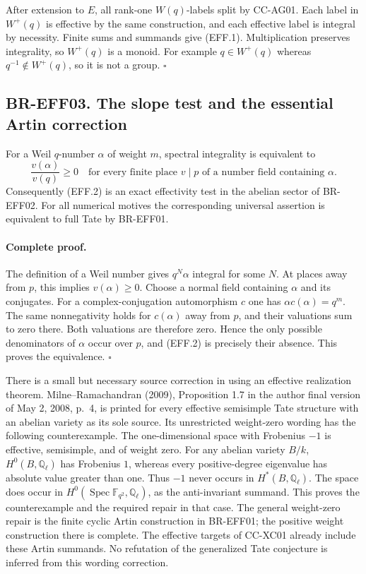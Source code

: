 \documentclass[11pt,a4paper]{article}
\theoremstyle{definition}\newtheorem{definition}[theorem]{Definition}
\theoremstyle{remark}\newtheorem{remark}[theorem]{Remark}
\begin{document}
After extension to $E$, all rank-one $W(q)$-labels split by
CC-AG01.  Each label in $W^+(q)$ is effective by the same
construction, and each effective label is integral by necessity.
Finite sums and summands give (EFF.1).  Multiplication preserves
integrality, so $W^+(q)$ is a monoid.  For example $q\in W^+(q)$
whereas $q^{-1}\notin W^+(q)$, so it is not a group.
\(\square\)

\subsection{BR-EFF03. The slope test and the essential Artin correction}
For a Weil $q$-number $\alpha$ of weight $m$, spectral integrality
is equivalent to
\[
 \frac{v(\alpha)}{v(q)}\geq0
 \quad\text{for every finite place }v\mid p
 \text{ of a number field containing }\alpha.
 \tag{EFF.2}
\]
Consequently (EFF.2) is an exact effectivity test in the abelian
sector of BR-EFF02.  For all numerical motives the corresponding
universal assertion is equivalent to full Tate by BR-EFF01.

\paragraph{Complete proof.}
The definition of a Weil number gives $q^N\alpha$ integral for
some $N$.  At places away from $p$, this implies $v(\alpha)\geq0$.
Choose a normal field containing $\alpha$ and its conjugates.
For a complex-conjugation automorphism $c$ one has
$\alpha c(\alpha)=q^m$.  The same nonnegativity holds for
$c(\alpha)$ away from $p$, and their valuations sum to zero
there.  Both valuations are therefore zero.  Hence the only
possible denominators of $\alpha$ occur over $p$, and (EFF.2)
is precisely their absence.  This proves the equivalence.
\(\square\)

There is a small but necessary source correction in using an
effective realization theorem.  Milne--Ramachandran (2009),
Proposition 1.7 in the author final version of May 2, 2008,
p.~4, is printed for every effective semisimple Tate structure
with an abelian variety as its sole source.  Its unrestricted
weight-zero wording has the following counterexample.
The one-dimensional space with Frobenius $-1$ is effective,
semisimple, and of weight zero.  For any abelian variety $B/k$,
$H^0(B,\mathbb Q_\ell)$ has Frobenius $1$, whereas every
positive-degree eigenvalue has absolute value greater than one.
Thus $-1$ never occurs in $H^*(B,\mathbb Q_\ell)$.
The space does occur in
$H^0(\operatorname{Spec}\mathbb F_{q^2},\mathbb Q_\ell)$, as
the anti-invariant summand.  This proves the counterexample and
the required repair in that case.  The general weight-zero repair
is the finite cyclic Artin construction in BR-EFF01; the positive
weight construction there is complete.  The effective targets of
CC-XC01 already include these Artin summands.  No refutation of
the generalized Tate conjecture is inferred from this wording
correction.
\end{document}
